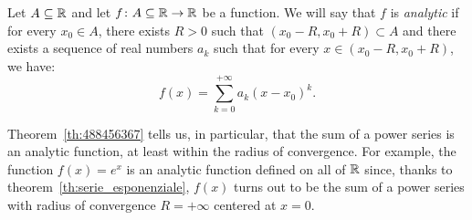 \begin{definition}
%
Let $A\subseteq {\mathbb R}$ and let $f\colon A\subseteq {\mathbb R} \to {\mathbb R}$ be a function. We will
say that $f$ is \emph{analytic} if for every $x_0\in A$, there exists $R>0$ such
that $(x_0-R,x_0+R)\subset A$ and there exists a sequence of real numbers $a_k$
such that for every $x\in (x_0-R,x_0+R)$, we have:
\[
  f(x) = \sum_{k=0}^{+\infty} a_k (x-x_0)^k.
\]
\end{definition}

Theorem~\ref{th:488456367} tells us, in particular, that the sum of a power
series is an analytic function, at least within the radius of convergence. For
example, the function $f(x)=e^x$ is an analytic function defined on all of ${\mathbb R}$
since, thanks to theorem~\ref{th:serie_esponenziale}, $f(x)$ turns out to be the
sum of a power series with radius of convergence $R=+\infty$ centered at $x=0$.

